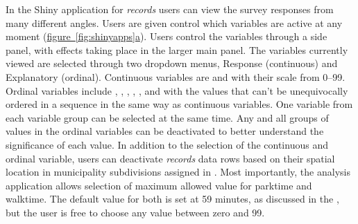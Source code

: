 In the Shiny application for \textit{records} users can view the survey responses from many different angles. Users are given control which variables are active at any moment (\hyperref[fig:shinyapps]{figure~\ref{fig:shinyapps}a}). Users control the variables through a side panel, with effects taking place in the larger main panel. The variables currently viewed are selected through two dropdown menus, Response (continuous) and Explanatory (ordinal). Continuous variables are  and  with their scale from 0--99. Ordinal variables include , , , , , and  with the values that can't be unequivocally ordered in a sequence in the same way as continuous variables. One variable from each variable group can be selected at the same time. Any and all groups of values in the ordinal variables can be deactivated to better understand the significance of each value. In addition to the selection of the continuous and ordinal variable, users can deactivate \textit{records} data rows based on their spatial location in municipality subdivisions assigned in \hyperref[sec:processdata]{}. Most importantly, the analysis application allows selection of maximum allowed value for parktime and walktime. The default value for both is set at 59 minutes, as discussed in the , but the user is free to choose any value between zero and 99.

